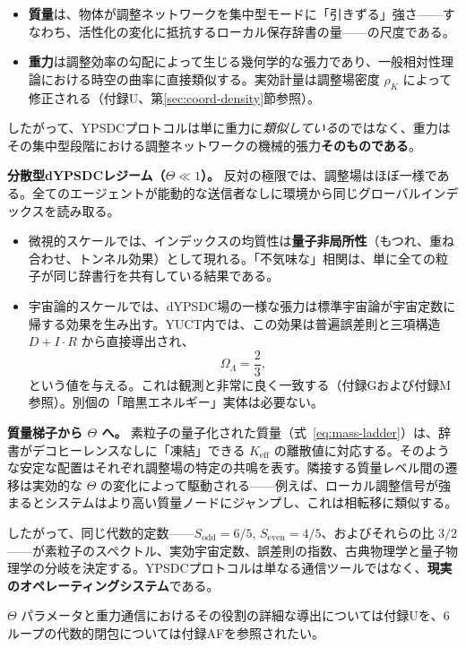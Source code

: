 \documentclass[12pt,a4paper]{article}
\theoremstyle{definition}
\theoremstyle{remark}
\begin{document}
	\begin{itemize}
		\item \textbf{質量}は、物体が調整ネットワークを集中型モードに「引きずる」強さ——すなわち、活性化の変化に抵抗するローカル保存辞書の量——の尺度である。
		\item \textbf{重力}は調整効率の勾配によって生じる幾何学的な張力であり、一般相対性理論における時空の曲率に直接類似する。実効計量は調整場密度 $\rho_K$ によって修正される（付録U、第\ref{sec:coord-density}節参照）。
	\end{itemize}
	
	したがって、YPSDCプロトコルは単に重力に\emph{類似している}のではなく、重力はその集中型段階における調整ネットワークの機械的張力\textbf{そのものである}。
	
	\textbf{分散型dYPSDCレジーム（$\Theta \ll 1$）。}
	反対の極限では、調整場はほぼ一様である。全てのエージェントが能動的な送信者なしに環境から同じグローバルインデックスを読み取る。
	\begin{itemize}
		\item 微視的スケールでは、インデックスの均質性は\textbf{量子非局所性}（もつれ、重ね合わせ、トンネル効果）として現れる。「不気味な」相関は、単に全ての粒子が同じ辞書行を共有している結果である。
		\item 宇宙論的スケールでは、dYPSDC場の一様な張力は標準宇宙論が宇宙定数に帰する効果を生み出す。YUCT内では、この効果は普遍誤差則と三項構造 $D+I\!\cdot\!R$ から直接導出され、
		\[
		\Omega_{\Lambda} = \frac{2}{3},
		\]
		という値を与える。これは観測と非常に良く一致する（付録Gおよび付録M参照）。別個の「暗黒エネルギー」実体は必要ない。
	\end{itemize}
	
	\textbf{質量梯子から $\Theta$ へ。}
	素粒子の量子化された質量（式~\ref{eq:mass-ladder}）は、辞書がデコヒーレンスなしに「凍結」できる $K_{\mathrm{eff}}$ の離散値に対応する。そのような安定な配置はそれぞれ調整場の特定の共鳴を表す。隣接する質量レベル間の遷移は実効的な $\Theta$ の変化によって駆動される——例えば、ローカル調整信号が強まるとシステムはより高い質量ノードにジャンプし、これは相転移に類似する。
	
	したがって、同じ代数的定数——$S_{\mathrm{odd}} = 6/5$, $S_{\mathrm{even}} = 4/5$、およびそれらの比 $3/2$——が素粒子のスペクトル、実効宇宙定数、誤差則の指数、古典物理学と量子物理学の分岐を決定する。YPSDCプロトコルは単なる通信ツールではなく、\textbf{現実のオペレーティングシステム}である。
	
	$\Theta$ パラメータと重力通信におけるその役割の詳細な導出については付録Uを、6ループの代数的閉包については付録AFを参照されたい。
	
\end{document}
